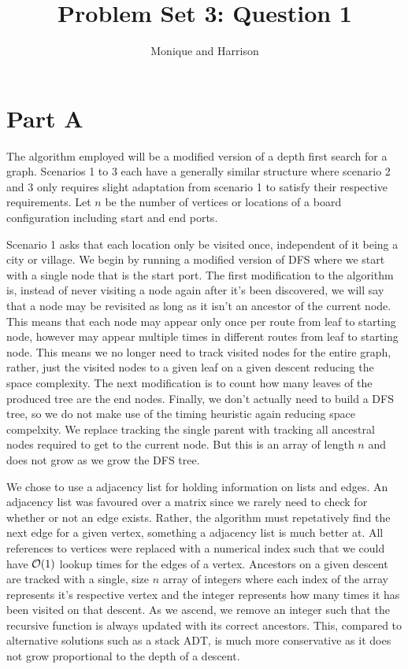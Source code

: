 \documentclass[12pt]{article}
\title{Problem Set 3: Question 1}
\author{Monique and Harrison}
\begin{document}
\maketitle

\section*{Part A}

The algorithm employed will be a modified version of a depth first search for a graph. Scenarios 1 to 3 each have a generally similar structure where scenario 2 and 3 only requires slight adaptation from scenario 1 to satisfy their respective requirements. Let $n$ be the number of vertices or locations of a board configuration including start and end ports.

Scenario 1 asks that each location only be visited once, independent of it being a city or village. We begin by running a modified version of DFS where we start with a single node that is the start port. The first modification to the algorithm is, instead of never visiting a node again after it's been discovered, we will say that a node may be revisited as long as it isn't an ancestor of the current node. This means that each node may appear only once per route from leaf to starting node, however may appear multiple times in different routes from leaf to starting node. This means we no longer need to track visited nodes for the entire graph, rather, just the visited nodes to a given leaf on a given descent reducing the space complexity. The next modification is to count how many leaves of the produced tree are the end nodes. Finally, we don't actually need to build a DFS tree, so we do not make use of the timing heuristic again reducing space compelxity. We replace tracking the single parent with tracking all ancestral nodes required to get to the current node. But this is an array of length $n$ and does not grow as we grow the DFS tree.

We chose to use a adjacency list for holding information on lists and edges. An adjacency list was favoured over a matrix since we rarely need to check for whether or not an edge exists. Rather, the algorithm must repetatively find the next edge for a given vertex, something a adjacency list is much better at. All references to vertices were replaced with a numerical index such that we could have $\mathcal O(1)$ lookup times for the edges of a vertex. Ancestors on a given descent are tracked with a single, size $n$ array of integers where each index of the array represents it's respective vertex and the integer represents how many times it has been visited on that descent. As we ascend, we remove an integer such that the recursive function is always updated with its correct ancestors. This, compared to alternative solutions such as a stack ADT, is much more conservative as it does not grow proportional to the depth of a descent.
\end{document}
